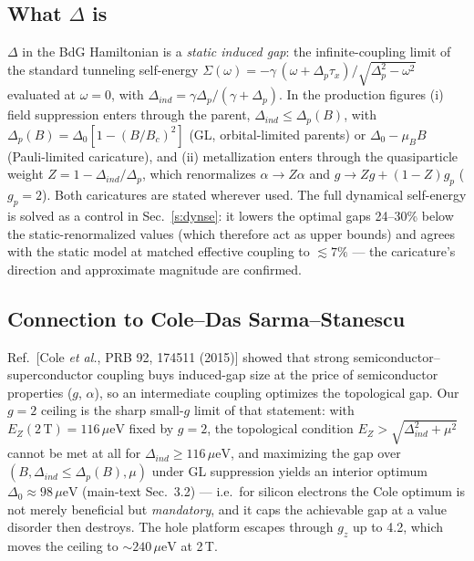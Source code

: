 \documentclass[11pt]{article}
\newcommand{\ueV}{\,\mu\mathrm{eV}}
\begin{document}
\subsection{What $\Delta$ is}
$\Delta$ in the BdG Hamiltonian is a \emph{static induced gap}: the
infinite-coupling limit of the standard tunneling self-energy
$\Sigma(\omega) = -\gamma\,(\omega + \Delta_p\tau_x)/\sqrt{\Delta_p^2 -
\omega^2}$ evaluated at $\omega = 0$, with
$\Delta_{ind} = \gamma\Delta_p/(\gamma + \Delta_p)$. In the production
figures (i) field suppression enters through the parent,
$\Delta_{ind} \le \Delta_p(B)$, with
$\Delta_p(B) = \Delta_0[1 - (B/B_c)^2]$ (GL, orbital-limited parents) or
$\Delta_0 - \mu_B B$ (Pauli-limited caricature), and (ii) metallization
enters through the quasiparticle weight $Z = 1 - \Delta_{ind}/\Delta_p$,
which renormalizes $\alpha \to Z\alpha$ and
$g \to Zg + (1-Z)g_p$ ($g_p = 2$). Both caricatures are stated wherever
used. The full dynamical self-energy is solved as a control in
Sec.~\ref{s:dynse}: it lowers the optimal gaps 24--30\% below the
static-renormalized values (which therefore act as upper bounds) and agrees
with the static model at matched effective coupling to $\lesssim 7\%$ ---
the caricature's direction and approximate magnitude are confirmed.

\subsection{Connection to Cole--Das Sarma--Stanescu}\label{s:cole}
Ref.~[Cole \emph{et al.}, PRB 92, 174511 (2015)] showed that strong
semiconductor--superconductor coupling buys induced-gap size at the price
of semiconductor properties ($g$, $\alpha$), so an intermediate coupling
optimizes the topological gap. Our $g=2$ ceiling is the sharp small-$g$
limit of that statement: with $E_Z(2\,\mathrm{T}) = 116\ueV$ fixed by
$g = 2$, the topological condition $E_Z > \sqrt{\Delta_{ind}^2 + \mu^2}$
cannot be met at all for $\Delta_{ind} \ge 116\ueV$, and maximizing the
gap over $(B, \Delta_{ind} \le \Delta_p(B), \mu)$ under GL suppression
yields an interior optimum $\Delta_0 \approx 98\ueV$
(main-text Sec.~3.2) --- i.e.\ for silicon electrons the Cole optimum is
not merely beneficial but \emph{mandatory}, and it caps the achievable
gap at a value disorder then destroys. The hole platform escapes through
$g_z$ up to 4.2, which moves the ceiling to $\sim 240\ueV$ at 2\,T.
\end{document}
